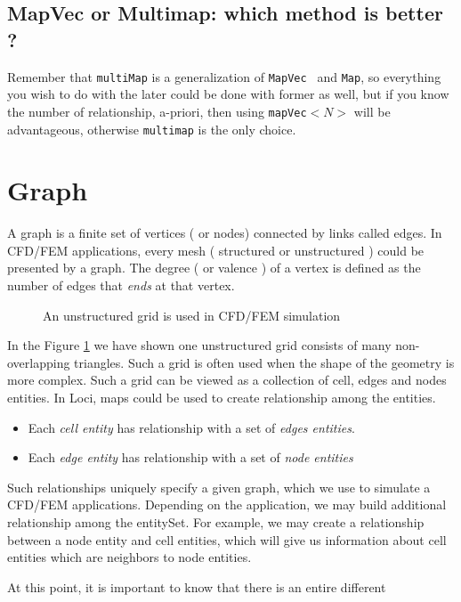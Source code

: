 \subsection{ MapVec or Multimap: which method is better ? }
\par Remember that {\tt multiMap} is a generalization of {\tt MapVec } and {\tt Map}, 
so everything you wish to do with the later could be done with former as well, but
if you know the number of relationship, a-priori, then using {\tt mapVec$<N>$} 
will be advantageous, otherwise {\tt multimap} is the only choice. 

\section { Graph }
A graph is a finite set of vertices ( or nodes) connected by links called edges. 
In CFD/FEM applications, every mesh ( structured or unstructured ) could be 
presented by a graph. The degree ( or valence ) of a vertex is defined as the
number of edges that {\em ends} at that vertex.  
%
\begin{figure}[h]
\vspace{2.0in}\caption { An unstructured grid is used in CFD/FEM simulation }
\label{FigGraph}
\end{figure}
%
\par In the Figure \ref{FigGraph} we have shown one unstructured grid consists of
many non-overlapping triangles. Such a grid is often used when the shape of the geometry 
is more complex. Such a grid can be viewed as a collection of cell, edges
and nodes entities. In Loci, maps could be used to create relationship among the
entities.  
\begin{itemize}
\item Each {\em cell entity} has relationship with a set of {\em edges entities}.
\item Each {\em edge entity} has relationship with a set of {\em node entities}
\end{itemize}
Such relationships uniquely specify a given graph,
which we use to simulate a CFD/FEM applications. Depending on the application, 
we may build additional relationship among the entitySet. For example, we may 
create a relationship between a node entity and cell entities, which will give 
us information about cell entities which are neighbors to node entities.
%
\par At this point, it is important to know that there is an entire different
